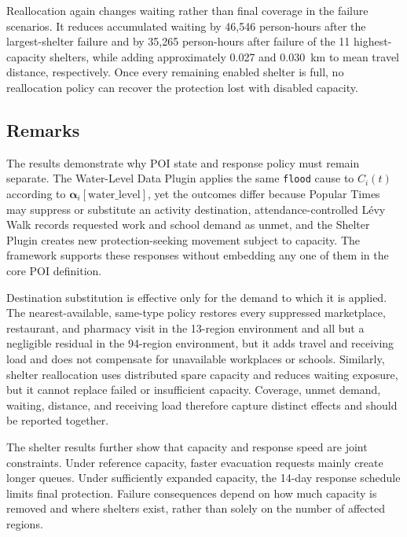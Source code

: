 Reallocation again changes waiting rather than final coverage in the failure scenarios. It reduces accumulated waiting by 46,546 person-hours after the largest-shelter failure and by 35,265 person-hours after failure of the 11 highest-capacity shelters, while adding approximately 0.027 and 0.030~km to mean travel distance, respectively. Once every remaining enabled shelter is full, no reallocation policy can recover the protection lost with disabled capacity.

\subsection{Remarks}

The results demonstrate why POI state and response policy must remain separate. The Water-Level Data Plugin applies the same \texttt{flood} cause to $C_i(t)$ according to $\bm{\alpha}_i[\mathrm{water\_level}]$, yet the outcomes differ because Popular Times may suppress or substitute an activity destination, attendance-controlled L\'evy Walk records requested work and school demand as unmet, and the Shelter Plugin creates new protection-seeking movement subject to capacity. The framework supports these responses without embedding any one of them in the core POI definition.

Destination substitution is effective only for the demand to which it is applied. The nearest-available, same-type policy restores every suppressed marketplace, restaurant, and pharmacy visit in the 13-region environment and all but a negligible residual in the 94-region environment, but it adds travel and receiving load and does not compensate for unavailable workplaces or schools. Similarly, shelter reallocation uses distributed spare capacity and reduces waiting exposure, but it cannot replace failed or insufficient capacity. Coverage, unmet demand, waiting, distance, and receiving load therefore capture distinct effects and should be reported together.

The shelter results further show that capacity and response speed are joint constraints. Under reference capacity, faster evacuation requests mainly create longer queues. Under sufficiently expanded capacity, the 14-day response schedule limits final protection. Failure consequences depend on how much capacity is removed and where shelters exist, rather than solely on the number of affected regions.

